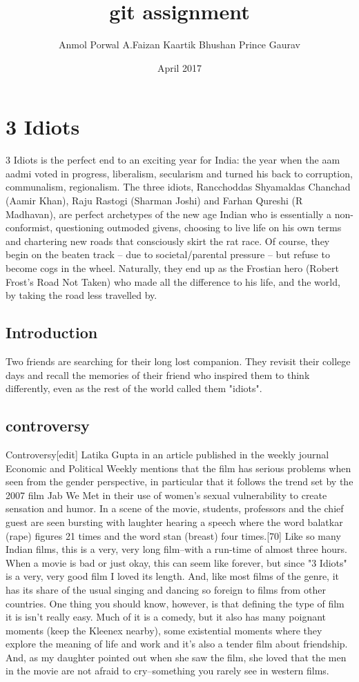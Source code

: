 \documentclass{article}
\title{git assignment}
\author{Anmol Porwal A.Faizan Kaartik Bhushan Prince Gaurav }
\date{April 2017}
\begin{document}
\maketitle

\section{3 Idiots}
3 Idiots is the perfect end to an exciting year for India: the year when the aam aadmi voted in progress, liberalism, secularism and turned his back to corruption, communalism, regionalism. The three idiots, Rancchoddas Shyamaldas Chanchad (Aamir Khan), Raju Rastogi (Sharman Joshi) and Farhan Qureshi (R Madhavan), are perfect archetypes of the new age Indian who is essentially a non-conformist, questioning outmoded givens, choosing to live life on his own terms and chartering new roads that consciously skirt the rat race. Of course, they begin on the beaten track -- due to societal/parental pressure -- but refuse to become cogs in the wheel. Naturally, they end up as the Frostian hero (Robert Frost's Road Not Taken) who made all the difference to his life, and the world, by taking the road less travelled by.

\subsection{Introduction}
Two friends are searching for their long lost companion. They revisit their college days and recall the memories of their friend who inspired them to think differently, even as the rest of the world called them "idiots".
\subsection{controversy}
Controversy[edit]
Latika Gupta in an article published in the weekly journal Economic and Political Weekly mentions that the film has serious problems when seen from the gender perspective, in particular that it follows the trend set by the 2007 film Jab We Met in their use of women's sexual vulnerability to create sensation and humor. In a scene of the movie, students, professors and the chief guest are seen bursting with laughter hearing a speech where the word balatkar (rape) figures 21 times and the word stan (breast) four times.[70]
Like so many Indian films, this is a very, very long film--with a run-time of almost three hours. When a movie is bad or just okay, this can seem like forever, but since "3 Idiots" is a very, very good film I loved its length. And, like most films of the genre, it has its share of the usual singing and dancing so foreign to films from other countries. One thing you should know, however, is that defining the type of film it is isn't really easy. Much of it is a comedy, but it also has many poignant moments (keep the Kleenex nearby), some existential moments where they explore the meaning of life and work and it's also a tender film about friendship. And, as my daughter pointed out when she saw the film, she loved that the men in the movie are not afraid to cry--something you rarely see in western films.
\end{document}
